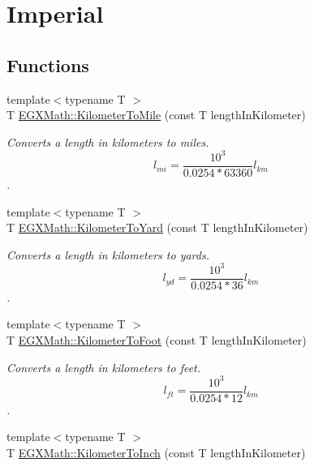 \hypertarget{group___e_g_x_math-_conversions-_length_conversions-_s_i-_kilometer-_imperial}{}\section{Imperial}
\label{group___e_g_x_math-_conversions-_length_conversions-_s_i-_kilometer-_imperial}
\subsection*{Functions}
\begin{DoxyCompactItemize}
\item 
{\footnotesize template$<$typename T $>$ }\\T \mbox{\hyperlink{group___e_g_x_math-_conversions-_length_conversions-_s_i-_kilometer-_imperial_ga781cd502fe13eb76e4e6b8e1fa7d55ed}{E\+G\+X\+Math\+::\+Kilometer\+To\+Mile}} (const T length\+In\+Kilometer)
\begin{DoxyCompactList}\small\item\em Converts a length in kilometers to miles. \[ l_{mi}=\frac{10^{3}}{0.0254 * 63360} l_{km} \]. \end{DoxyCompactList}\item 
{\footnotesize template$<$typename T $>$ }\\T \mbox{\hyperlink{group___e_g_x_math-_conversions-_length_conversions-_s_i-_kilometer-_imperial_ga98f724c96246bb6dcb517fc64ff5ade1}{E\+G\+X\+Math\+::\+Kilometer\+To\+Yard}} (const T length\+In\+Kilometer)
\begin{DoxyCompactList}\small\item\em Converts a length in kilometers to yards. \[ l_{yd}= \frac{10^{3}}{0.0254 * 36} l_{km} \]. \end{DoxyCompactList}\item 
{\footnotesize template$<$typename T $>$ }\\T \mbox{\hyperlink{group___e_g_x_math-_conversions-_length_conversions-_s_i-_kilometer-_imperial_ga8e07a35f01e011462db88b5cb2896416}{E\+G\+X\+Math\+::\+Kilometer\+To\+Foot}} (const T length\+In\+Kilometer)
\begin{DoxyCompactList}\small\item\em Converts a length in kilometers to feet. \[ l_{ft}= \frac{10^{3}}{0.0254 * 12} l_{km} \]. \end{DoxyCompactList}\item 
{\footnotesize template$<$typename T $>$ }\\T \mbox{\hyperlink{group___e_g_x_math-_conversions-_length_conversions-_s_i-_kilometer-_imperial_ga6f1d41be3b2039495abff4f256148aa7}{E\+G\+X\+Math\+::\+Kilometer\+To\+Inch}} (const T length\+In\+Kilometer)

\end{DoxyCompactItemize}
